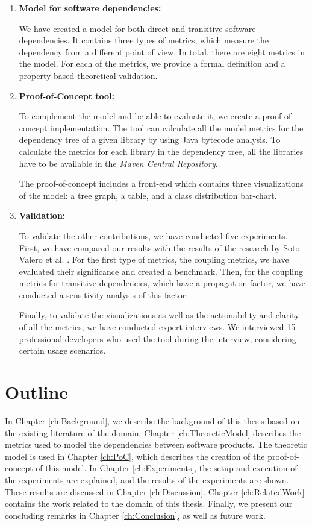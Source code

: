 \begin{enumerate}
  \item \textbf{Model for software dependencies:}

    We have created a model for both direct and transitive software dependencies. It contains three types of metrics, which measure the dependency from a different point of view. In total, there are eight metrics in the model. For each of the metrics, we provide a formal definition and a property-based theoretical validation.

  	\item \textbf{Proof-of-Concept tool:}

    To complement the model and be able to evaluate it, we create a proof-of-concept implementation. The tool can calculate all the model metrics for the dependency tree of a given library by using Java bytecode analysis. To calculate the metrics for each library in the dependency tree, all the libraries have to be available in the \textit{Maven Central Repository}.

    The proof-of-concept includes a front-end which contains three visualizations of the model: a tree graph, a table, and a class distribution bar-chart.

    \item \textbf{Validation:}

    To validate the other contributions, we have conducted five experiments. First, we have compared our results with the results of the research by Soto-Valero et al. \cite{soto2020comprehensive}. For the first type of metrics, the coupling metrics, we have evaluated their significance and created a benchmark. Then, for the coupling metrics for transitive dependencies, which have a propagation factor, we have conducted a sensitivity analysis of this factor.

    Finally, to validate the visualizations as well as the actionability and clarity of all the metrics, we have conducted expert interviews. We interviewed 15 professional developers who used the tool during the interview, considering certain usage scenarios.
    
\end{enumerate}

\section{Outline}
In Chapter \ref{ch:Background}, we describe the background of this thesis based on the existing literature of the domain.
Chapter \ref{ch:TheoreticModel} describes the metrics used to model the dependencies between software products.
The theoretic model is used in Chapter \ref{ch:PoC}, which describes the creation of the proof-of-concept of this model.
In Chapter \ref{ch:Experiments}, the setup and execution of the experiments are explained, and the results of the experiments are shown. These results are discussed in Chapter \ref{ch:Discussion}. Chapter \ref{ch:RelatedWork} contains the work related to the domain of this thesis.
Finally, we present our concluding remarks in Chapter \ref{ch:Conclusion}, as well as future work.
